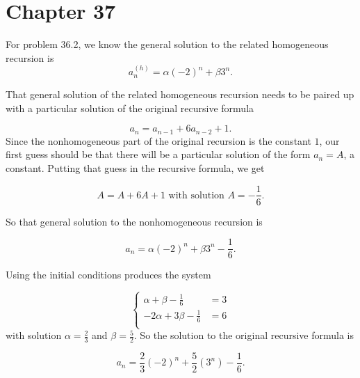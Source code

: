    \section*{Chapter 37}
    
\begin{Solution}{37.1}

For problem 36.2, we know the general solution to the related homogeneous recursion is
\[
a_n^{(h)} = \alpha(-2)^n +\beta3^n.
\]

That general solution of the related homogeneous recursion needs to be paired up with a particular solution of the original 
recursive formula

\[
a_n = a_{n-1} + 6a_{n-2}+1.
\]
Since the nonhomogeneous part of the original recursion is the constant $1$, our first guess should be that there
will be a particular solution of the form $a_n = A$, a constant. Putting that guess in the recursive formula, we get

\[
A = A + 6A + 1 \text{ with solution } A = -\frac{1}{6}.
\]

So that general solution to the nonhomogeneous recursion is

\[
a_n = \alpha(-2)^n +\beta3^n - \frac{1}{6}.
\]

Using the initial conditions produces the system

\[
  \left\{
    \begin{aligned}
     \alpha + \beta  - \frac{1}{6} &= 3\\
     -2\alpha + 3\beta - \frac{1}{6} &= 6\\
     \end{aligned}
   \right.
\]
with solution $\alpha = \frac{2}{3} $ and $\beta = \frac{5}{2}$. So the solution to the original recursive formula is

\[
a_n = \frac{2}{3}(-2)^n +\frac{5}{2}(3^n) - \frac{1}{6}.
\]

\end{Solution}

